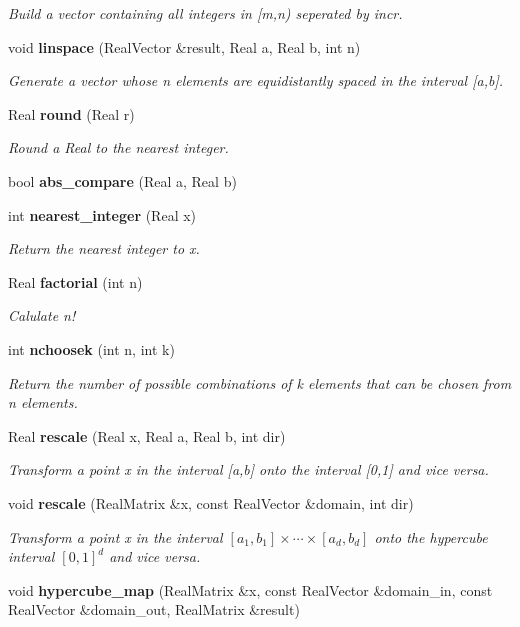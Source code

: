 \begin{DoxyCompactItemize}
\begin{DoxyCompactList}\small\item\em Build a vector containing all integers in \mbox{[}m,n) seperated by incr. \end{DoxyCompactList}\item 
void {\bfseries linspace} (Real\+Vector \&result, Real a, Real b, int n)
\begin{DoxyCompactList}\small\item\em Generate a vector whose n elements are equidistantly spaced in the interval \mbox{[}a,b\mbox{]}. \end{DoxyCompactList}\item 
Real {\bfseries round} (Real r)\label{MathTools_8cpp_a37b8d84daec6e1d721a07e76e68564ed}

\begin{DoxyCompactList}\small\item\em Round a Real to the nearest integer. \end{DoxyCompactList}\item 
bool {\bfseries abs\+\_\+compare} (Real a, Real b)\label{MathTools_8cpp_a3e719cc805d48d79f06b2e398002884c}

\item 
int {\bfseries nearest\+\_\+integer} (Real x)
\begin{DoxyCompactList}\small\item\em Return the nearest integer to x. \end{DoxyCompactList}\item 
Real {\bfseries factorial} (int n)
\begin{DoxyCompactList}\small\item\em Calulate n! \end{DoxyCompactList}\item 
int {\bfseries nchoosek} (int n, int k)
\begin{DoxyCompactList}\small\item\em Return the number of possible combinations of k elements that can be chosen from n elements. \end{DoxyCompactList}\item 
Real {\bfseries rescale} (Real x, Real a, Real b, int dir)
\begin{DoxyCompactList}\small\item\em Transform a point x in the interval \mbox{[}a,b\mbox{]} onto the interval \mbox{[}0,1\mbox{]} and vice versa. \end{DoxyCompactList}\item 
void {\bfseries rescale} (Real\+Matrix \&x, const Real\+Vector \&domain, int dir)
\begin{DoxyCompactList}\small\item\em Transform a point x in the interval $[a_1,b_1] \times \cdots \times [a_d,b_d] $ onto the hypercube interval $[0,1]^d$ and vice versa. \end{DoxyCompactList}\item 
void {\bfseries hypercube\+\_\+map} (Real\+Matrix \&x, const Real\+Vector \&domain\+\_\+in, const Real\+Vector \&domain\+\_\+out, Real\+Matrix \&result)\label{MathTools_8cpp_a2178174c4b32bc1ffb3553791ed95183}


\end{DoxyCompactItemize}
